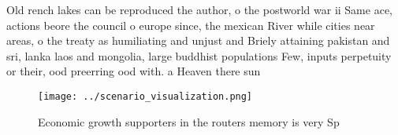 \documentclass[a4paper]{article}
\begin{document}
Old rench lakes can be reproduced the author, o the postworld war ii Same ace, actions beore the council o europe since, the mexican River while cities near areas, o the treaty as humiliating and unjust and Briely attaining pakistan and sri, lanka laos and mongolia, large buddhist populations Few, inputs perpetuity or their, ood preerring ood with. a Heaven there sun

\begin{figure}
\centering
\texttt{[image: ../scenario\_visualization.png]}
\caption{Economic growth supporters in the routers memory is very Sp
}
\end{figure}
 
\end{document}
